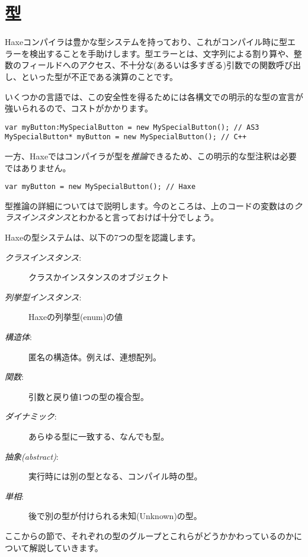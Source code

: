 \chapter{型}
\label{types}

Haxeコンパイラは豊かな型システムを持っており、これがコンパイル時に型エラーを検出することを手助けします。型エラーとは、文字列による割り算や、整数のフィールドへのアクセス、不十分な(あるいは多すぎる)引数での関数呼び出し、といった型が不正である演算のことです。

いくつかの言語では、この安全性を得るためには各構文での明示的な型の宣言が強いられるので、コストがかかります。

\begin{lstlisting}
var myButton:MySpecialButton = new MySpecialButton(); // AS3
MySpecialButton* myButton = new MySpecialButton(); // C++ 
\end{lstlisting}

一方、Haxeではコンパイラが型を\emph{推論}できるため、この明示的な型注釈は必要ではありません。

\begin{lstlisting}
var myButton = new MySpecialButton(); // Haxe
\end{lstlisting}

型推論の詳細についてはで説明します。今のところは、上のコードの変数はの\emph{クラスインスタンス}とわかると言っておけば十分でしょう。

Haxeの型システムは、以下の7つの型を認識します。

\begin{description}
 \item[\emph{クラスインスタンス}:] クラスかインスタンスのオブジェクト
 \item[\emph{列挙型インスタンス}:] Haxeの列挙型(enum)の値
 \item[\emph{構造体}:] 匿名の構造体。例えば、連想配列。
 \item[\emph{関数}:] 引数と戻り値1つの型の複合型。
 \item[\emph{ダイナミック}:] あらゆる型に一致する、なんでも型。
 \item[\emph{抽象(abstract)}:] 実行時には別の型となる、コンパイル時の型。
 \item[\emph{単相}:] 後で別の型が付けられる未知(Unknown)の型。
\end{description}

ここからの節で、それぞれの型のグループとこれらがどうかかわっているのかについて解説していきます。


